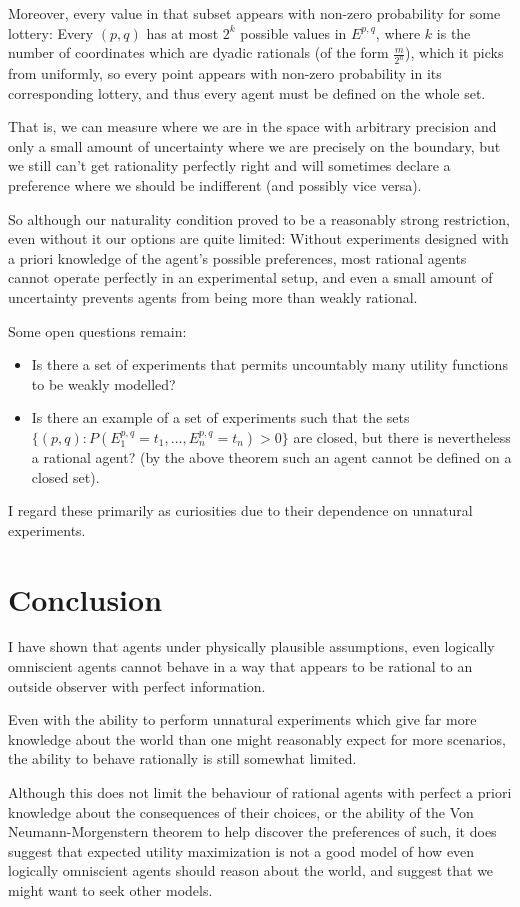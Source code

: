 \documentclass[a4paper]{book}
\begin{document}
Moreover, every value in that subset appears with non-zero probability for some
lottery: Every $(p, q)$
has at most $2^k$
possible values in $E^{p, q}$,
where $k$
is the number of coordinates which are dyadic rationals (of the form $\frac{m}{2^n}$),
which it picks from uniformly, so every point appears with non-zero probability
in its corresponding lottery, and thus every agent must be defined on the whole
set.

That is, we can measure where we are in the space with arbitrary precision and only
a small amount of uncertainty where we are precisely on the boundary, but we
still can't get rationality perfectly right and will sometimes declare a preference
where we should be indifferent (and possibly vice versa).

So although our naturality condition proved to be a reasonably strong restriction,
even without it our options are quite limited: Without experiments designed with
a priori knowledge of the agent's possible preferences, most rational agents
cannot operate perfectly in an experimental setup, and even a small amount of
uncertainty prevents agents from being more than weakly rational.

Some open questions remain:

\begin{itemize}
\item Is there a set of experiments that permits uncountably many utility functions
to be weakly modelled?
\item Is there an example of a set of experiments such that the sets
$\{(p, q): P(E^{p, q}_1 = t_1, \ldots, E^{p, q}_n = t_n) > 0\}$
are closed, but there is nevertheless a rational agent? (by the above theorem
such an agent cannot be defined on a closed set).
\end{itemize}

I regard these primarily as curiosities due to their dependence on unnatural experiments. 

\section{Conclusion}

I  have shown that agents under physically plausible assumptions, even logically
omniscient agents cannot behave in a way that appears to be rational to an
outside observer with perfect information.

Even with the ability to perform unnatural experiments which give far more
knowledge about the world than one might reasonably expect for more scenarios,
the ability to behave rationally is still somewhat limited.

Although this does not limit the behaviour of rational agents with perfect
a priori knowledge about the consequences of their choices, or the ability of
the Von Neumann-Morgenstern theorem to help discover the preferences of such,
it does suggest that expected utility maximization is not a good model of how
even logically omniscient agents should reason about the world, and suggest
that we might want to seek other models.

{}

\end{document}
